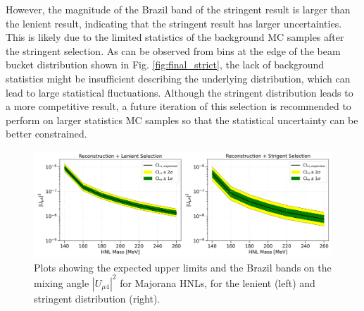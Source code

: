 However, the magnitude of the Brazil band of the stringent result is larger than the lenient result, indicating that the stringent result has larger uncertainties.
This is likely due to the limited statistics of the background MC samples after the stringent selection.
As can be observed from bins at the edge of the beam bucket distribution shown in Fig. \ref{fig:final_strict}, the lack of background statistics might be insufficient describing the underlying distribution, which can lead to large statistical fluctuations.
Although the stringent distribution leads to a more competitive result, a future iteration of this selection is recommended to perform on larger statistics MC samples so that the statistical uncertainty can be better constrained.

\begin{figure}[htbp!]
    \centering
    \includegraphics[width=\textwidth]{sensitivity_strict_loose}
    \caption{Plots showing the expected upper limits and the Brazil bands on the mixing angle $|U_{\mu4}|^2$ for Majorana HNLs, for the lenient (left) and stringent distribution (right).}
    \label{fig:nupi0_reco_result}
\end{figure}

